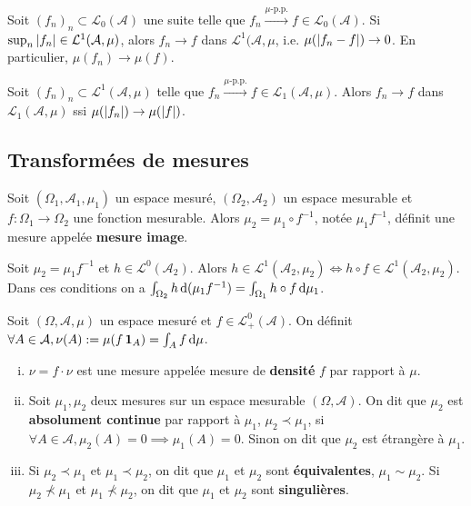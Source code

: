 	
	\begin{thm}
		Soit $(f_n)_n \subset \mathcal{L}_0(\mathcal{A})$ une suite telle que $f_n \overset{\mu \text{-p.p.}}{\longrightarrow} f \in \mathcal{L}_0(\mathcal{A})$.
		Si $\sup_n \left\lvert f_n\right\rvert \in \mathcal{L}^1(\mathcal{A},\mu)$, alors $f_n \to f$ dans $\mathcal{L}^1(\mathcal{A},\mu$, i.e. $\mu(\left\lvert f_n - f\right\rvert) \to 0$.
		En particulier, $\mu(f_n) \to \mu(f)$.
	\end{thm}
	
	\begin{lem}
		Soit $(f_n)_n \subset \mathcal{L}^1(\mathcal{A},\mu)$ telle que $f_n \overset{\mu \text{-p.p.}}{\longrightarrow} f \in \mathcal{L}_1(\mathcal{A},\mu)$.
		Alors $f_n \to f$ dans $\mathcal{L}_1(\mathcal{A},\mu)$ ssi $\mu(\left\lvert f_n\right\rvert) \to \mu(\left\lvert f\right\rvert)$.
	\end{lem}


\subsection{Transformées de mesures}

	\begin{defn}
		Soit $(\Omega_1, \mathcal{A}_1, \mu_1)$ un espace mesuré, $(\Omega_2, \mathcal{A}_2)$ un espace mesurable et $f \colon \Omega_1 \to \Omega_2$ une fonction mesurable.
		Alors $\mu_2 = \mu_1 \circ f^{-1}$, notée $\mu_1 f^{-1}$, définit une mesure appelée \textbf{mesure image}.
	\end{defn}

	\begin{thm}[transfert]
		Soit $\mu_2 = \mu_1 f^{-1}$ et $h \in \mathcal{L}^0(\mathcal{A}_2)$.
		Alors $h \in \mathcal{L}^1(\mathcal{A}_2, \mu_2) \iff h \circ f \in \mathcal{L}^1(\mathcal{A}_2, \mu_2)$.
		Dans ces conditions on a $\int_{\Omega_2} h \mathop{}\mathopen{}\mathrm{d}(\mu_1 f^{-1}) = \int_{\Omega_1} h \circ f \mathop{}\mathopen{}\mathrm{d} \mu_1$.
	\end{thm}

	\begin{defn}
		Soit $(\Omega,\mathcal{A},\mu)$ un espace mesuré et $f \in \mathcal{L}_+^0(\mathcal{A})$.
		On définit $\forall A \in \mathcal{A}, \nu(A) := \mu(f \operatorname{\mathbf{1}}_A) = \int_A f \mathop{}\mathopen{}\mathrm{d} \mu$.
		\begin{enumerate}[(i)]
			\item $\nu = f \cdot \nu$ est une mesure appelée mesure de \textbf{densité} $f$ par rapport à $\mu$.
			\item Soit $\mu_1, \mu_2$ deux mesures sur un espace mesurable $(\Omega,\mathcal{A})$.
				On dit que $\mu_2$ est \textbf{absolument continue} par rapport à $\mu_1$, $\mu_2 \prec \mu_1$, si $\forall A \in \mathcal{A}, \mu_2(A) = 0 \implies \mu_1(A) = 0$.
				Sinon on dit que $\mu_2$ est étrangère à $\mu_1$.
			\item Si $\mu_2 \prec \mu_1$ et $\mu_1 \prec \mu_2$, on dit que $\mu_1$ et $\mu_2$ sont \textbf{équivalentes}, $\mu_1 \sim \mu_2$.
				Si $\mu_2 \not\prec \mu_1$ et $\mu_1 \not\prec \mu_2$, on dit que $\mu_1$ et $\mu_2$ sont \textbf{singulières}.
		\end{enumerate}
	\end{defn}

